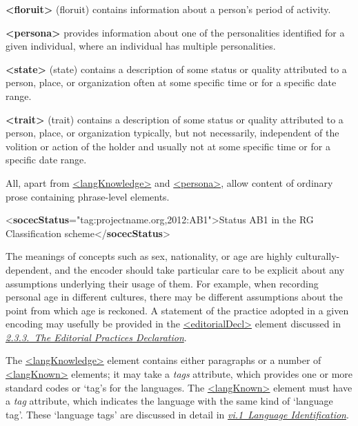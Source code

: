 \begin{sansreflist}
\item [\textbf{<floruit>}] (floruit) contains information about a person's period of activity.
\item [\textbf{<persona>}] provides information about one of the personalities identified for a given individual, where an individual has multiple personalities.
\item [\textbf{<state>}] (state) contains a description of some status or quality attributed to a person, place, or organization often at some specific time or for a specific date range.
\item [\textbf{<trait>}] (trait) contains a description of some status or quality attributed to a person, place, or organization typically, but not necessarily, independent of the volition or action of the holder and usually not at some specific time or for a specific date range.
\end{sansreflist}
 All, apart from \hyperref[TEI.langKnowledge]{<langKnowledge>} and \hyperref[TEI.persona]{<persona>}, allow content of ordinary prose containing phrase-level elements. \par\bgroup{}\exampleFont \begin{shaded}\noindent\mbox{}{<\textbf{socecStatus}\hspace*{1em}{ref}="{tag:projectname.org,2012:AB1}">}Status AB1 in the RG Classification scheme{</\textbf{socecStatus}>}\end{shaded}\egroup\par \noindent  \par
The meanings of concepts such as sex, nationality, or age are highly culturally-dependent, and the encoder should take particular care to be explicit about any assumptions underlying their usage of them. For example, when recording personal age in different cultures, there may be different assumptions about the point from which age is reckoned. A statement of the practice adopted in a given encoding may usefully be provided in the \hyperref[TEI.editorialDecl]{<editorialDecl>} element discussed in \textit{\hyperref[HD53]{2.3.3.\ The Editorial Practices Declaration}}.\par
The \hyperref[TEI.langKnowledge]{<langKnowledge>} element contains either paragraphs or a number of \hyperref[TEI.langKnown]{<langKnown>} elements; it may take a {\itshape tags} attribute, which provides one or more standard codes or ‘tag’s for the languages. The \hyperref[TEI.langKnown]{<langKnown>} element must have a {\itshape tag} attribute, which indicates the language with the same kind of ‘language tag’. These ‘language tags’ are discussed in detail in \textit{\hyperref[CHSH]{vi.1\ Language Identification}}.\par
